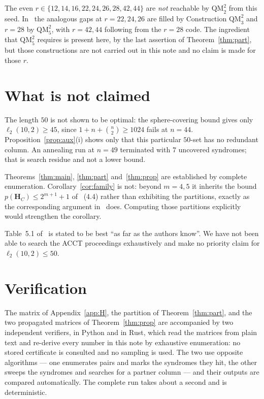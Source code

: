 \documentclass[11pt,a4paper]{article}
\theoremstyle{definition}
\theoremstyle{remark}
\newcommand{\HH}{\boldsymbol{H}}
\begin{document}
The even $r\in\{12,14,16,22,24,26,28,42,44\}$ are \emph{not} reachable by
$\mathrm{QM}_2^2$ from this seed. In~\cite{DMP2025} the analogous gaps at
$r=22,24,26$ are filled by Construction $\mathrm{QM}_3^2$ and $r=28$ by
$\mathrm{QM}_5^2$, with $r=42,44$ following from the $r=28$ code. The
ingredient that $\mathrm{QM}_5^2$ requires is present here, by the last
assertion of Theorem~\ref{thm:part}, but those constructions are not carried
out in this note and no claim is made for those $r$.

\section{What is not claimed}

The length $50$ is not shown to be optimal: the sphere-covering bound gives
only $\ell_2(10,2)\ge45$, since $1+n+\binom n2\ge1024$ fails at $n=44$.
Proposition~\ref{prop:aux}(i) shows only that this particular $50$-set has no
redundant column. An annealing run at $n=49$ terminated with $7$ uncovered
syndromes; that is search residue and not a lower bound.

Theorems~\ref{thm:main}, \ref{thm:part} and~\ref{thm:prop} are established by
complete enumeration. Corollary~\ref{cor:family} is not: beyond $m=4,5$ it
inherits the bound $p(\HH_C)\le2^{m+1}+1$ of~\cite{DMP2025} (4.4) rather than
exhibiting the partitions, exactly as the corresponding argument
in~\cite{DMP2025} does. Computing those partitions explicitly would strengthen
the corollary.

Table~5.1 of~\cite{DMP2025} is stated to be best ``as far as the authors
know''. We have not been able to search the ACCT proceedings exhaustively and
make no priority claim for $\ell_2(10,2)\le50$.

\section*{Verification}

The matrix of Appendix~\ref{app:H}, the partition of Theorem~\ref{thm:part},
and the two propagated matrices of Theorem~\ref{thm:prop} are accompanied by
two independent verifiers, in Python and in Rust, which read the matrices from
plain text and re-derive every number in this note by exhaustive enumeration:
no stored certificate is consulted and no sampling is used. The two use
opposite algorithms --- one enumerates pairs and marks the syndromes they hit,
the other sweeps the syndromes and searches for a partner column --- and their
outputs are compared automatically. The complete run takes about a second and
is deterministic.
\end{document}
